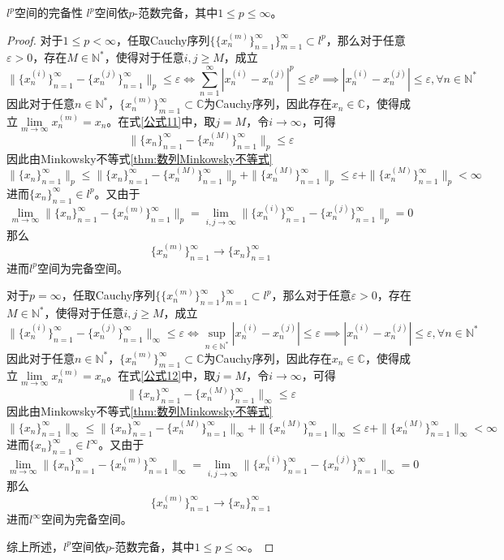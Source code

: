 \documentclass[lang = cn, scheme = chinese, thmcnt = section]{elegantbook}
\newcommand{\N}{\mathbb{N}}            %
\newcommand{\C}{\mathbb{C}}  		   %
\newcommand{\sub}{\subset}             %
\begin{document}
\begin{theorem}{$l^p$空间的完备性}
	$l^p$空间依$p$-范数完备，其中$1\le p\le \infty$。
\end{theorem}

\begin{proof}
	对于$1\le p<\infty$，任取Cauchy序列$\{ \{x_n^{(m)}\}_{n=1}^{\infty} \}_{m=1}^{\infty}\sub l^p$，那么对于任意$\varepsilon>0$，存在$M\in\N^*$，使得对于任意$i,j\ge M$，成立
	\begin{equation}
		\label{公式11}\|\{x_n^{(i)}\}_{n=1}^{\infty}-\{x_n^{(j)}\}_{n=1}^{\infty}\|_p\le\varepsilon
		\iff \sum_{n=1}^{\infty}|x_n^{(i)}-x_n^{(j)}|^p\le\varepsilon^p
		\implies |x_n^{(i)}-x_n^{(j)}|\le\varepsilon,\forall n\in\N^*\tag*{(*)}
	\end{equation}
	因此对于任意$n\in\N^*$，$\{ x_n^{(m)} \}_{m=1}^{\infty}\sub\C$为Cauchy序列，因此存在$x_n\in\C$，使得成立$\lim\limits_{m\to\infty}x_n^{(m)}=x_n$。在式\ref{公式11}中，取$j=M$，令$i\to\infty$，可得
	$$
	\|\{x_n\}_{n=1}^{\infty}-\{x_n^{(M)}\}_{n=1}^{\infty}\|_p\le\varepsilon
	$$
	因此由Minkowsky不等式\ref{thm:数列Minkowsky不等式}
	$$
	\|\{x_n\}_{n=1}^{\infty}\|_p
	\le \|\{x_n\}_{n=1}^{\infty}-\{x_n^{(M)}\}_{n=1}^{\infty}\|_p+\|\{x_n^{(M)}\}_{n=1}^{\infty}\|_p\le \varepsilon+\|\{x_n^{(M)}\}_{n=1}^{\infty}\|_p<\infty
	$$
	进而$\{ x_n \}_{n=1}^{\infty}\in l^p$。又由于
	$$
	\lim_{m\to\infty}\|\{x_n\}_{n=1}^{\infty}-\{x_n^{(m)}\}_{n=1}^{\infty}\|_p
	=\lim_{i,j\to\infty}\|\{x_n^{(i)}\}_{n=1}^{\infty}-\{x_n^{(j)}\}_{n=1}^{\infty}\|_p=0
	$$
	那么
	$$
	\{x_n^{(m)}\}_{n=1}^{\infty}\longrightarrow \{x_n\}_{n=1}^{\infty}
	$$
	进而$l^p$空间为完备空间。
	
	对于$p=\infty$，任取Cauchy序列$\{ \{x_n^{(m)}\}_{n=1}^{\infty} \}_{m=1}^{\infty}\sub l^p$，那么对于任意$\varepsilon>0$，存在$M\in\N^*$，使得对于任意$i,j\ge M$，成立
	\begin{equation}
		\label{公式12}\|\{x_n^{(i)}\}_{n=1}^{\infty}-\{x_n^{(j)}\}_{n=1}^{\infty}\|_\infty\le\varepsilon
		\iff \sup_{n\in\N^*}|x_n^{(i)}-x_n^{(j)}|\le\varepsilon
		\implies |x_n^{(i)}-x_n^{(j)}|\le\varepsilon,\forall n\in\N^*\tag*{(**)}
	\end{equation}
	因此对于任意$n\in\N^*$，$\{ x_n^{(m)} \}_{m=1}^{\infty}\sub\C$为Cauchy序列，因此存在$x_n\in\C$，使得成立$\lim\limits_{m\to\infty}x_n^{(m)}=x_n$。在式\ref{公式12}中，取$j=M$，令$i\to\infty$，可得
	$$
	\|\{x_n\}_{n=1}^{\infty}-\{x_n^{(M)}\}_{n=1}^{\infty}\|_\infty\le\varepsilon
	$$
	因此由Minkowsky不等式\ref{thm:数列Minkowsky不等式}
	$$
	\|\{x_n\}_{n=1}^{\infty}\|_\infty
	\le \|\{x_n\}_{n=1}^{\infty}-\{x_n^{(M)}\}_{n=1}^{\infty}\|_\infty+\|\{x_n^{(M)}\}_{n=1}^{\infty}\|_\infty\le \varepsilon+\|\{x_n^{(M)}\}_{n=1}^{\infty}\|_\infty<\infty
	$$
	进而$\{ x_n \}_{n=1}^{\infty}\in l^\infty$。又由于
	$$
	\lim_{m\to\infty}\|\{x_n\}_{n=1}^{\infty}-\{x_n^{(m)}\}_{n=1}^{\infty}\|_\infty
	=\lim_{i,j\to\infty}\|\{x_n^{(i)}\}_{n=1}^{\infty}-\{x_n^{(j)}\}_{n=1}^{\infty}\|_\infty=0
	$$
	那么
	$$
	\{x_n^{(m)}\}_{n=1}^{\infty}\longrightarrow \{x_n\}_{n=1}^{\infty}
	$$
	进而$l^\infty$空间为完备空间。
	
	综上所述，$l^p$空间依$p$-范数完备，其中$1\le p\le \infty$。
\end{proof}
\end{document}
